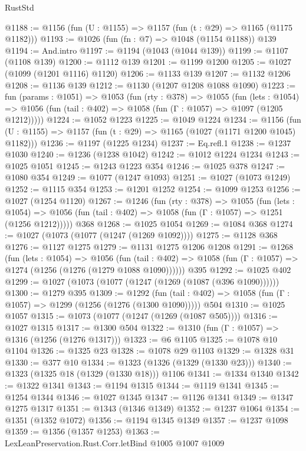 \begin{lexlean}{RustStd}
\begin{coremodule}
@1188 := @1156 (fun (U : @1155) => @1157 (fun (t : @29) => @1165 (@1175 @1182)))
@1193 := @1026 (fun (fn : @7) => @1048 (@1154 @1188)) @139
@1194 := And.intro
@1197 := @1194 (@1043 (@1044 @139))
@1199 := @1107 (@1108 @139)
@1200 := @1112 @139
@1201 := @1199 @1200
@1205 := @1027 (@1099 (@1201 @1116) @1120)
@1206 := @1133 @139
@1207 := @1132 @1206
@1208 := @1136 @139
@1212 := @1130 (@1207 @1208 @1088 @1090)
@1223 := fun (params : @1051) =>
  @1053
    (fun (rty : @378) =>
    @1055
      (fun (lets : @1054) =>
      @1056 (fun (tail : @402) => @1058 (fun (Γ : @1057) => @1097 (@1205 @1212)))))
@1224 := @1052 @1223
@1225 := @1049 @1224
@1234 := @1156 (fun (U : @1155) => @1157 (fun (t : @29) => @1165 (@1027 (@1171 @1200 @1045) @1182)))
@1236 := @1197 (@1225 @1234)
@1237 := Eq.refl.{1}
@1238 := @1237 @1030
@1240 := @1236 (@1238 @1042)
@1242 := @1012 @1224 @1234
@1243 := @1025 @1051
@1245 := @1243 @1223 @354
@1246 := @1025 @378
@1247 := @1080 @354
@1249 := @1077 (@1247 @1093)
@1251 := @1027 (@1073 @1249)
@1252 := @1115 @354
@1253 := @1201 @1252
@1254 := @1099 @1253
@1256 := @1027 (@1254 @1120)
@1267 := @1246
    (fun (rty : @378) =>
    @1055
      (fun (lets : @1054) =>
      @1056 (fun (tail : @402) => @1058 (fun (Γ : @1057) => @1251 (@1256 @1212)))))
    @368
@1268 := @1025 @1054
@1269 := @1084 @368
@1274 := @1027 (@1073 (@1077 (@1247 (@1269 @1092))))
@1275 := @1128 @368
@1276 := @1127 @1275
@1279 := @1131 @1275 @1206 @1208
@1291 := @1268
    (fun (lets : @1054) =>
    @1056
      (fun (tail : @402) => @1058 (fun (Γ : @1057) => @1274 (@1256 (@1276 (@1279 @1088 @1090))))))
    @395
@1292 := @1025 @402
@1299 := @1027 (@1073 (@1077 (@1247 (@1269 (@1087 (@396 @1090))))))
@1300 := @1279 @395
@1309 := @1292
    (fun (tail : @402) => @1058 (fun (Γ : @1057) => @1299 (@1256 (@1276 (@1300 @1090)))))
    @504
@1310 := @1025 @1057
@1315 := @1073 (@1077 (@1247 (@1269 (@1087 @505))))
@1316 := @1027 @1315
@1317 := @1300 @504
@1322 := @1310 (fun (Γ : @1057) => @1316 (@1256 (@1276 @1317)))
@1323 := @6 @1105
@1325 := @1078 @10 @1104
@1326 := @1325 @23
@1328 := @1078 @29 @1103
@1329 := @1328 @31
@1330 := @377 @10
@1334 := @1323 (@1326 (@1329 (@1330 @23)))
@1340 := @1323 (@1325 @18 (@1329 (@1330 @18))) @1106
@1341 := @1334 @1340
@1342 := @1322 @1341
@1343 := @1194 @1315
@1344 := @1119 @1341
@1345 := @1254 @1344
@1346 := @1027 @1345
@1347 := @1126 @1341
@1349 := @1347 @1275 @1317
@1351 := @1343 (@1346 @1349)
@1352 := @1237 @1064
@1354 := @1351 (@1352 @1072)
@1356 := @1194 @1345 @1349
@1357 := @1237 @1098
@1359 := @1356 (@1357 @1253)
@1363 := LexLeanPreservation.Rust.Corr.letBind @1005 @1007 @1009

\end{coremodule}
\end{lexlean}
